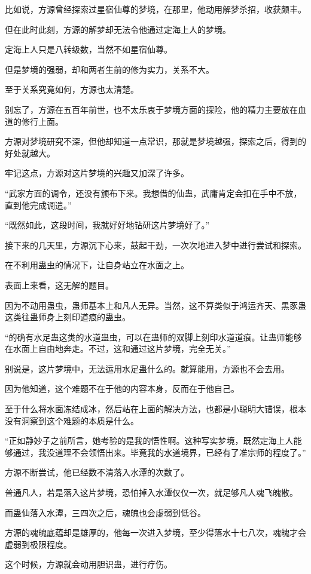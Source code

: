 \begin{this_body}
比如说，方源曾经探索过星宿仙尊的梦境，在那里，他动用解梦杀招，收获颇丰。

但在此时此刻，方源的解梦却无法令他通过定海上人的梦境。

定海上人只是八转级数，当然不如星宿仙尊。

但是梦境的强弱，却和两者生前的修为实力，关系不大。

至于关系究竟如何，方源也太清楚。

别忘了，方源在五百年前世，也不太乐衷于梦境方面的探险，他的精力主要放在血道的修行上面。

方源对梦境研究不深，但他却知道一点常识，那就是梦境越强，探索之后，得到的好处就越大。

牢记这点，方源对这片梦境的兴趣又加深了许多。

“武家方面的调令，还没有颁布下来。我想借的仙蛊，武庸肯定会扣在手中不放，直到他完成调遣。”

“既然如此，这段时间，我就好好地钻研这片梦境好了。”

接下来的几天里，方源沉下心来，鼓起干劲，一次次地进入梦中进行尝试和探索。

在不利用蛊虫的情况下，让自身站立在水面之上。

表面上来看，这无解的题目。

因为不动用蛊虫，蛊师基本上和凡人无异。当然，这不算类似于鸿运齐天、黒豕蛊这类往蛊师身上刻印道痕的蛊虫。

“的确有水足蛊这类的水道蛊虫，可以在蛊师的双脚上刻印水道道痕。让蛊师能够在水面上自由地奔走。不过，这和通过这片梦境，完全无关。”

别说是，这片梦境中，无法运用水足蛊什么的。就算能用，方源也不会去用。

因为他知道，这个难题不在于他的内容本身，反而在于他自己。

至于什么将水面冻结成冰，然后站在上面的解决方法，也都是小聪明大错误，根本没有洞察到这个难题的本质是什么。

“正如静妙子之前所言，她考验的是我的悟性啊。这种写实梦境，既然定海上人能够通过，我没道理不会领悟出来。毕竟我的水道境界，已经有了准宗师的程度了。”

方源不断尝试，他已经数不清落入水潭的次数了。

普通凡人，若是落入这片梦境，恐怕掉入水潭仅仅一次，就足够凡人魂飞魄散。

而蛊仙落入水潭，三四次之后，魂魄也会虚弱到低谷。

方源的魂魄底蕴却是雄厚的，他每一次进入梦境，至少得落水十七八次，魂魄才会虚弱到极限程度。

这个时候，方源就会动用胆识蛊，进行疗伤。


\end{this_body}
